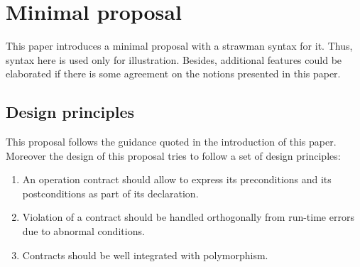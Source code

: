 \section{Minimal proposal}

This paper introduces a minimal proposal with a strawman syntax for it.
Thus, syntax here is used only for illustration. Besides, additional
features could be elaborated if there is some agreement on the notions
presented in this paper.

\subsection{Design principles}

This proposal follows the guidance quoted in the introduction of this paper.
Moreover the design of this proposal tries to follow a set of design principles:

\begin{enumerate}
\item An operation contract should allow to express its preconditions and its
postconditions as part of its declaration.
\item Violation of a contract should be handled orthogonally from run-time
errors due to abnormal conditions.
\item Contracts should be well integrated with polymorphism.
\end{enumerate}

